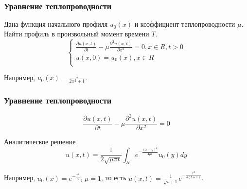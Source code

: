 \documentclass[10pt]{beamer}
\begin{document}
\begin{frame}[fragile]
\frametitle{Уравнение теплопроводности}
Дана функция начального профиля $u_0(x)$ и коэффициент теплопроводности $\mu$. Найти профиль в произвольный момент времени $T$.
$$
\begin{cases} 
\frac{\partial u(x,t)}{\partial t} - \mu \frac{\partial^2 u(x,t)}{\partial x^2} = 0, x \in R, t > 0\\
u(x, 0) = u_0(x), x \in R\\
\end{cases}
$$

Например, $u_0(x) = \frac{1}{2 x^2 + 1}$.
\begin{center}
\end{center}
\end{frame}

\begin{frame}[fragile]
\frametitle{Уравнение теплопроводности}

$$\frac{\partial u(x,t)}{\partial t} - \mu \frac{\partial^2 u(x,t)}{\partial x^2} = 0$$

Аналитическое решение
$$u(x, t) = \frac{1}{2 \sqrt{\mu \pi t}} \int_{R} e^{-\frac{(x - y)^2}{4 \mu t}} u_0(y) dy$$

Например, $u_0(x) = e^{-\frac{x^2}{4}}$, $\mu = 1$, то есть $u(x, t) = \frac{1}{\sqrt{t+1}} e^{-\frac{x^2}{4(t+1)}}$.
\begin{center}
\end{center}
\end{frame}
\end{document}
